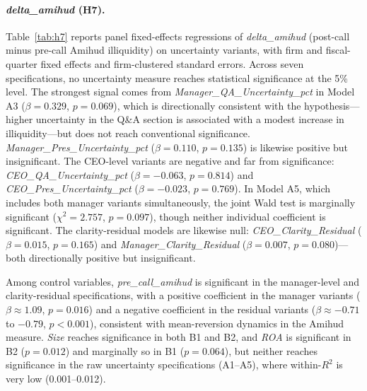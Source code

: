 \documentclass[12pt,a4paper]{article}
\begin{document}
\paragraph{\textit{delta\_amihud} (H7).}
Table~\ref{tab:h7} reports panel fixed-effects regressions of \textit{delta\_amihud} (post-call minus pre-call Amihud illiquidity) on uncertainty variants, with firm and fiscal-quarter fixed effects and firm-clustered standard errors. Across seven specifications, no uncertainty measure reaches statistical significance at the 5\% level. The strongest signal comes from \textit{Manager\_QA\_Uncertainty\_pct} in Model A3 ($\beta = 0.329$, $p = 0.069$), which is directionally consistent with the hypothesis---higher uncertainty in the Q\&A section is associated with a modest increase in illiquidity---but does not reach conventional significance. \textit{Manager\_Pres\_Uncertainty\_pct} ($\beta = 0.110$, $p = 0.135$) is likewise positive but insignificant. The CEO-level variants are negative and far from significance: \textit{CEO\_QA\_Uncertainty\_pct} ($\beta = -0.063$, $p = 0.814$) and \textit{CEO\_Pres\_Uncertainty\_pct} ($\beta = -0.023$, $p = 0.769$). In Model A5, which includes both manager variants simultaneously, the joint Wald test is marginally significant ($\chi^2 = 2.757$, $p = 0.097$), though neither individual coefficient is significant. The clarity-residual models are likewise null: \textit{CEO\_Clarity\_Residual} ($\beta = 0.015$, $p = 0.165$) and \textit{Manager\_Clarity\_Residual} ($\beta = 0.007$, $p = 0.080$)---both directionally positive but insignificant.

Among control variables, \textit{pre\_call\_amihud} is significant in the manager-level and clarity-residual specifications, with a positive coefficient in the manager variants ($\beta \approx 1.09$, $p = 0.016$) and a negative coefficient in the residual variants ($\beta \approx -0.71$ to $-0.79$, $p < 0.001$), consistent with mean-reversion dynamics in the Amihud measure. \textit{Size} reaches significance in both B1 and B2, and \textit{ROA} is significant in B2 ($p = 0.012$) and marginally so in B1 ($p = 0.064$), but neither reaches significance in the raw uncertainty specifications (A1--A5), where within-$R^2$ is very low (0.001--0.012).
\end{document}
